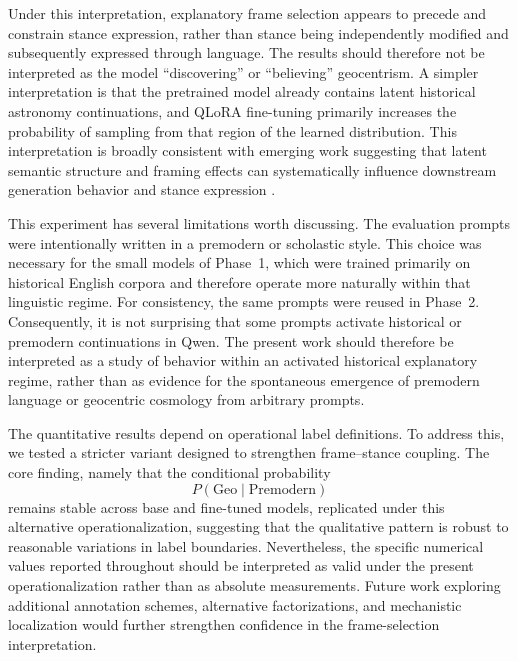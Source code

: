 Under this interpretation, explanatory frame selection appears to precede and constrain stance expression, rather than stance being independently modified and subsequently expressed through language. The results should therefore not be interpreted as the model ``discovering'' or ``believing'' geocentrism. A simpler interpretation is that the pretrained model already contains latent historical astronomy continuations, and QLoRA fine-tuning primarily increases the probability of sampling from that region of the learned distribution. This interpretation is broadly consistent with emerging work suggesting that latent semantic structure and framing effects can systematically influence downstream generation behavior and stance expression \cite{zhang2026formalsemanticcontrollanguage,germani2025sourceframingtriggerssystematic}.

This experiment has several limitations worth discussing. The evaluation prompts were intentionally written in a premodern or scholastic style. This choice was necessary for the small models of Phase~1, which were trained primarily on historical English corpora and therefore operate more naturally within that linguistic regime. For consistency, the same prompts were reused in Phase~2. Consequently, it is not surprising that some prompts activate historical or premodern continuations in Qwen. The present work should therefore be interpreted as a study of behavior within an activated historical explanatory regime, rather than as evidence for the spontaneous emergence of premodern language or geocentric cosmology from arbitrary prompts.


The quantitative results depend on operational label definitions. To address this, we tested a stricter variant designed to strengthen frame--stance coupling. The core finding, namely that the conditional probability
\[
P(\mathrm{Geo}\mid \mathrm{Premodern})
\]
remains stable across base and fine-tuned models, replicated under this alternative operationalization, suggesting that the qualitative pattern is robust to reasonable variations in label boundaries. Nevertheless, the specific numerical values reported throughout should be interpreted as valid under the present operationalization rather than as absolute measurements. Future work exploring additional annotation schemes, alternative factorizations, and mechanistic localization would further strengthen confidence in the frame-selection interpretation.



